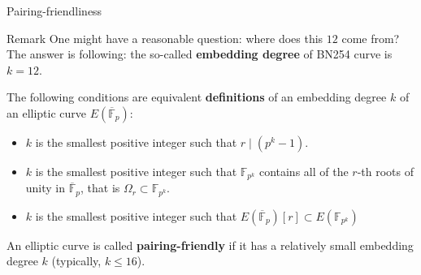 \documentclass{zkdl-presentation-template}
\begin{document}
    \begin{frame}{Pairing-friendliness}
        \begin{block}{Remark}
            One might have a reasonable question: where does this $12$ come from? The answer is following: the so-called \textbf{embedding degree} of BN254 curve is $k=12$.
        \end{block}
        
        \begin{definition}
            The following conditions are equivalent \textbf{definitions} of an embedding degree $k$ of an elliptic curve $E(\overline{\mathbb{F}}_p)$:
            \begin{itemize}
                \item $k$ is the smallest positive integer such that $r \mid (p^k-1)$.
                \item $k$ is the smallest positive integer such that $\mathbb{F}_{p^k}$ contains all of the $r$-th roots of unity in $\overline{\mathbb{F}}_p$, that is $\Omega_r \subset \mathbb{F}_{p^k}$.
                \item $k$ is the smallest positive integer such that $E(\overline{\mathbb{F}}_p)[r] \subset E(\mathbb{F}_{p^k})$
            \end{itemize}
             An elliptic curve is called \textbf{pairing-friendly} if it has a relatively small embedding degree $k$ (typically, $k \leq 16$).
        \end{definition}
    \end{frame}
\end{document}
